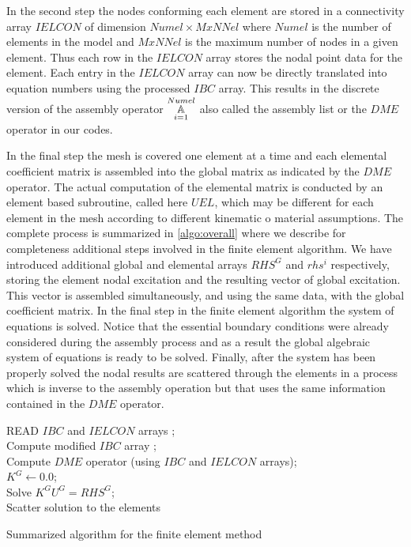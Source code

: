 In the second step the nodes conforming each element are stored in a connectivity array  $IELCON$ of dimension $Numel \times MxNNel$ where $Numel$ is the number of elements in the model and $MxNNel$ is the maximum number of nodes in a given element. Thus each row in the $IELCON$ array stores the nodal point data for the element. Each entry in the $IELCON$ array can now be directly translated into equation numbers using the processed $IBC$ array. This results in the discrete version of the assembly operator $\assem{i=1}{Numel}$ also called the assembly list or the $DME$ operator in our codes.

In the final step the mesh is covered one element at a time and each elemental coefficient matrix is assembled into the global matrix as indicated by the $DME$ operator. The actual computation of the elemental matrix is conducted by an element based subroutine, called here $UEL$, which may be different for each element in the mesh according to different kinematic o material assumptions. The complete process is summarized in \cref{algo:overall} where we describe for completeness additional steps involved in the finite element algorithm. We have introduced additional global and elemental arrays $RHS^G$ and $rhs^i$ respectively, storing the element nodal excitation and the resulting vector of global excitation. This vector is assembled simultaneously, and using the same data, with the global coefficient matrix. In the final step in the finite element algorithm the system of equations is solved. Notice that the essential boundary conditions were already considered during the assembly process and as a result the global algebraic system of equations is ready to be solved. Finally, after the system has been properly solved the nodal results are scattered through the elements in a process which is inverse to the assembly operation but that uses the same information contained in the $DME$ operator.

\begin{algorithm}[H]\label{algo:overall}
\SetAlgoLined
{}
\BlankLine
READ $IBC$ and $IELCON$ arrays ;\\
Compute modified $IBC$ array ;\\
Compute $DME$ operator (using $IBC$ and $IELCON$ arrays);\\
$K^G \leftarrow 0.0$;\\
\BlankLine
{}
\BlankLine
Solve ${K^G}{U^G} = RH{S^G}$;\\
Scatter solution to the elements
\caption{Summarized algorithm for the finite element method}
\end{algorithm}
\newpage

